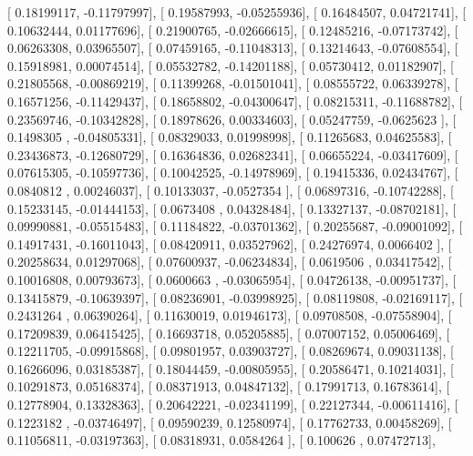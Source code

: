 \documentclass{article}
\begin{document}
       [ 0.18199117, -0.11797997],
       [ 0.19587993, -0.05255936],
       [ 0.16484507,  0.04721741],
       [ 0.10632444,  0.01177696],
       [ 0.21900765, -0.02666615],
       [ 0.12485216, -0.07173742],
       [ 0.06263308,  0.03965507],
       [ 0.07459165, -0.11048313],
       [ 0.13214643, -0.07608554],
       [ 0.15918981,  0.00074514],
       [ 0.05532782, -0.14201188],
       [ 0.05730412,  0.01182907],
       [ 0.21805568, -0.00869219],
       [ 0.11399268, -0.01501041],
       [ 0.08555722,  0.06339278],
       [ 0.16571256, -0.11429437],
       [ 0.18658802, -0.04300647],
       [ 0.08215311, -0.11688782],
       [ 0.23569746, -0.10342828],
       [ 0.18978626,  0.00334603],
       [ 0.05247759, -0.0625623 ],
       [ 0.1498305 , -0.04805331],
       [ 0.08329033,  0.01998998],
       [ 0.11265683,  0.04625583],
       [ 0.23436873, -0.12680729],
       [ 0.16364836,  0.02682341],
       [ 0.06655224, -0.03417609],
       [ 0.07615305, -0.10597736],
       [ 0.10042525, -0.14978969],
       [ 0.19415336,  0.02434767],
       [ 0.0840812 ,  0.00246037],
       [ 0.10133037, -0.0527354 ],
       [ 0.06897316, -0.10742288],
       [ 0.15233145, -0.01444153],
       [ 0.0673408 ,  0.04328484],
       [ 0.13327137, -0.08702181],
       [ 0.09990881, -0.05515483],
       [ 0.11184822, -0.03701362],
       [ 0.20255687, -0.09001092],
       [ 0.14917431, -0.16011043],
       [ 0.08420911,  0.03527962],
       [ 0.24276974,  0.0066402 ],
       [ 0.20258634,  0.01297068],
       [ 0.07600937, -0.06234834],
       [ 0.0619506 ,  0.03417542],
       [ 0.10016808,  0.00793673],
       [ 0.0600663 , -0.03065954],
       [ 0.04726138, -0.00951737],
       [ 0.13415879, -0.10639397],
       [ 0.08236901, -0.03998925],
       [ 0.08119808, -0.02169117],
       [ 0.2431264 ,  0.06390264],
       [ 0.11630019,  0.01946173],
       [ 0.09708508, -0.07558904],
       [ 0.17209839,  0.06415425],
       [ 0.16693718,  0.05205885],
       [ 0.07007152,  0.05006469],
       [ 0.12211705, -0.09915868],
       [ 0.09801957,  0.03903727],
       [ 0.08269674,  0.09031138],
       [ 0.16266096,  0.03185387],
       [ 0.18044459, -0.00805955],
       [ 0.20586471,  0.10214031],
       [ 0.10291873,  0.05168374],
       [ 0.08371913,  0.04847132],
       [ 0.17991713,  0.16783614],
       [ 0.12778904,  0.13328363],
       [ 0.20642221, -0.02341199],
       [ 0.22127344, -0.00611416],
       [ 0.1223182 , -0.03746497],
       [ 0.09590239,  0.12580974],
       [ 0.17762733,  0.00458269],
       [ 0.11056811, -0.03197363],
       [ 0.08318931,  0.0584264 ],
       [ 0.100626  ,  0.07472713],
\end{document}
